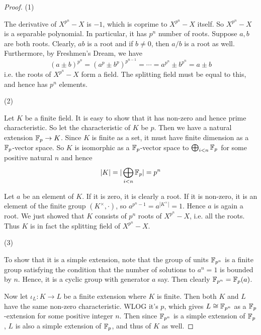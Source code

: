 \documentclass[../book.tex]{subfiles}
\begin{document}
\begin{proof}
    
    (1)
        
        The derivative of $X^{p^n} - X$ is $-1$, 
        which is coprime to $X^{p^n} - X$ itself.
        So $X^{p^n} - X$ is a separable polynomial. 
        In particular, it has $p^n$ number of roots. 
        Suppose $a, b$ are both roots.
        Clearly, $ab$ is a root and if $b \neq 0$, then $a / b$ is a root as well.
        Furthermore, by Freshmen's Dream, we have \[
            (a \pm b)^{p^n} = (a^p \pm b^p)^{p^{n-1}} = \cdots
            = a^{p^n} \pm b^{p^n} = a \pm b
        \]
        i.e. the roots of $X^{p^n} - X$ form a field.
        The splitting field must be equal to this, and hence has $p^n$ elements.
        
    (2)
        
        Let $K$ be a finite field. 
        It is easy to show that it has non-zero and hence prime characteristic. 
        So let the characteristic of $K$ be $p$. 
        Then we have a natural extension $\mathbb{F}_p \to K$. 
        Since $K$ is finite as a set, 
        it must have finite dimension as a $\mathbb{F}_p$-vector space.
        So $K$ is isomorphic as a $\mathbb{F}_p$-vector space to $\bigoplus_{i < n} \mathbb{F}_p$ 
        for some positive natural $n$ and hence \[
            |K| = |\bigoplus_{i < n} \mathbb{F}_p| = p^n
        \]
        
        Let $a$ be an element of $K$.
        If it is zero, it is clearly a root.
        If it is non-zero, it is an element of the finite group $(K^\times,\cdot)$,
        so $a^{p^n - 1} = a^{|K^\times|} = 1$.
        Hence $a$ is again a root. 
        We just showed that $K$ consists of $p^n$ roots of $X^{p^n} - X$, 
        i.e. all the roots.
        Thus $K$ is in fact the splitting field of $X^{p^n} - X$.
        
    (3)
        
        To show that it is a simple extension,
        note that the group of units $\mathbb{F}_{p^n}$ is a finite group
        satisfying the condition that the number of solutions to $a^n = 1$ 
        is bounded by $n$. 
        Hence, it is a cyclic group with generator $a$ say. 
        Then clearly $\mathbb{F}_{p^n} = \mathbb{F}_p(a)$. 
        
        Now let $\iota_L : K \to L$ be a finite extension where $K$ is finite.
        Then both $K$ and $L$ have the same non-zero characteristic.
        WLOG it's $p$, which gives $L \cong \mathbb{F}_{p^n}$ as a $\mathbb{F}_p$-extension
        for some positive integer $n$. 
        Then since $\mathbb{F}_{p^n}$ is a simple extension of $\mathbb{F}_p$,
        $L$ is also a simple extension of $\mathbb{F}_p$,
        and thus of $K$ as well. 
        

\end{proof}
\end{document}
